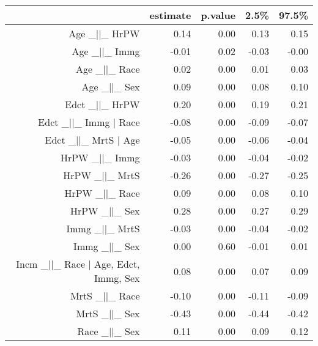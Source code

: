 \begin{table}[ht]
\centering
\begin{tabular}{rrrrr}
  \hline
 & estimate & p.value & 2.5\% & 97.5\% \\ 
  \hline
Age \_$|$$|$\_ HrPW & 0.14 & 0.00 & 0.13 & 0.15 \\ 
  Age \_$|$$|$\_ Immg & -0.01 & 0.02 & -0.03 & -0.00 \\ 
  Age \_$|$$|$\_ Race & 0.02 & 0.00 & 0.01 & 0.03 \\ 
  Age \_$|$$|$\_ Sex & 0.09 & 0.00 & 0.08 & 0.10 \\ 
  Edct \_$|$$|$\_ HrPW & 0.20 & 0.00 & 0.19 & 0.21 \\ 
  Edct \_$|$$|$\_ Immg $|$ Race & -0.08 & 0.00 & -0.09 & -0.07 \\ 
  Edct \_$|$$|$\_ MrtS $|$ Age & -0.05 & 0.00 & -0.06 & -0.04 \\ 
  HrPW \_$|$$|$\_ Immg & -0.03 & 0.00 & -0.04 & -0.02 \\ 
  HrPW \_$|$$|$\_ MrtS & -0.26 & 0.00 & -0.27 & -0.25 \\ 
  HrPW \_$|$$|$\_ Race & 0.09 & 0.00 & 0.08 & 0.10 \\ 
  HrPW \_$|$$|$\_ Sex & 0.28 & 0.00 & 0.27 & 0.29 \\ 
  Immg \_$|$$|$\_ MrtS & -0.03 & 0.00 & -0.04 & -0.02 \\ 
  Immg \_$|$$|$\_ Sex & 0.00 & 0.60 & -0.01 & 0.01 \\ 
  Incm \_$|$$|$\_ Race $|$ Age, Edct, Immg, Sex & 0.08 & 0.00 & 0.07 & 0.09 \\ 
  MrtS \_$|$$|$\_ Race & -0.10 & 0.00 & -0.11 & -0.09 \\ 
  MrtS \_$|$$|$\_ Sex & -0.43 & 0.00 & -0.44 & -0.42 \\ 
  Race \_$|$$|$\_ Sex & 0.11 & 0.00 & 0.09 & 0.12 \\ 
   \hline
\end{tabular}
\end{table}
